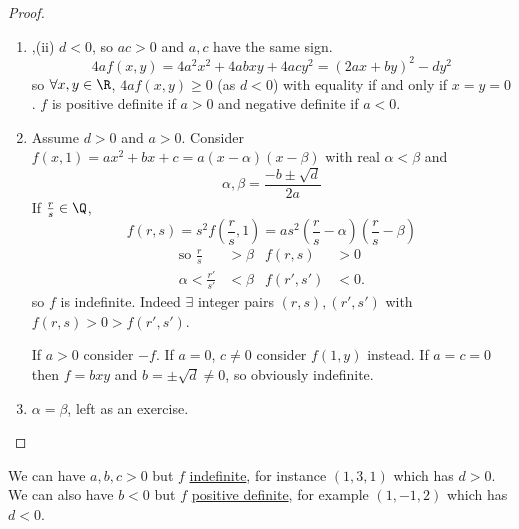 \documentclass{article}
\begin{document}
\begin{proof}
    \begin{enumerate}[label=(\roman*)]
        \item,(ii) $d < 0$, so $ac > 0$ and $a,c$ have the same sign.
            \begin{equation*}
                4a f(x, y) = 4 a^2 x^2 + 4 a b x y + 4 a c y^2 = (2ax+by)^2 - dy^2
            \end{equation*}
            so $\forall x, y \in \R$, $4a f(x, y) \geq 0$ (as $d < 0$) with equality if and only if $x = y = 0$.
            $f$ is positive definite if $a > 0$ and negative definite if $a < 0$.
        \setcounter{enumi}{2}
    \item Assume $d > 0$ and $a > 0$.
        Consider $f(x, 1) = a x^2 + b x + c = a(x - \alpha)(x - \beta)$ with real $\alpha < \beta$ and
        \begin{equation}
            \alpha, \beta = \frac{-b \pm \sqrt{d}}{2a}
        \end{equation}
        If $\frac{r}{s} \in \Q$,
        \begin{equation*}
            f(r, s) = s^2 f(\frac{r}{s}, 1) = a s^2 (\frac{r}{s} - \alpha)(\frac{r}{s} - \beta)
        \end{equation*}
        \begin{align*}
            \text{so } \frac{r}{s} &> \beta & f(r, s) &> 0 \\
            \alpha < \frac{r'}{s'} &< \beta & f(r', s') &< 0.
        \end{align*}
        so $f$ is indefinite.
        Indeed $\exists$ integer pairs $(r, s), (r', s')$ with $f(r, s) > 0 > f(r', s')$.

        If $a > 0$ consider $-f$. If $a = 0$, $c \neq 0$ consider $f(1, y)$ instead.
        If $a=c=0$ then $f = b xy$ and $b = \pm \sqrt{d} \neq 0$, so obviously indefinite.
    \item $\alpha = \beta$, left as an exercise.
    \end{enumerate}
\end{proof}

\begin{note}
    We can have $a, b, c > 0$ but $f$ \hyperlink{def:definite}{indefinite}, for instance $(1, 3, 1)$ which has $d > 0$.
    We can also have $b < 0$ but $f$ \hyperlink{def:definite}{positive definite}, for example $(1, -1, 2)$ which has $d < 0$.
\end{note}
\end{document}
